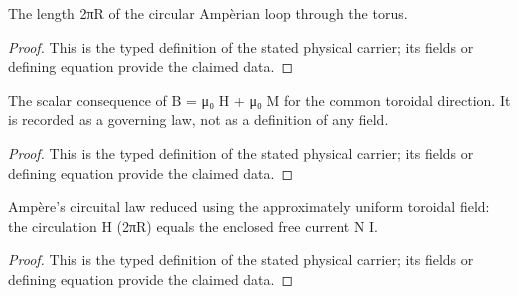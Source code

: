 \begin{definition}
  \label{def:physics:IPhO_2026_3_A_1:aux016}
  The length 2πR of the circular Ampèrian loop through the torus.
\end{definition}
\begin{proof}
  This is the typed definition of the stated physical carrier; its fields or defining equation provide the claimed data.
\end{proof}

\begin{definition}
  \label{def:physics:IPhO_2026_3_A_1:aux017}
  The scalar consequence of B = μ₀ H + μ₀ M for the common toroidal direction. It is recorded as a governing law, not as a definition of any field.
\end{definition}
\begin{proof}
  This is the typed definition of the stated physical carrier; its fields or defining equation provide the claimed data.
\end{proof}

\begin{definition}
  \label{def:physics:IPhO_2026_3_A_1:aux018}
  Ampère's circuital law reduced using the approximately uniform toroidal field: the circulation H (2πR) equals the enclosed free current N I.
\end{definition}
\begin{proof}
  This is the typed definition of the stated physical carrier; its fields or defining equation provide the claimed data.
\end{proof}
